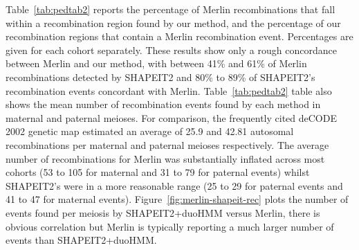 Table~\ref{tab:pedtab2} reports the percentage of Merlin recombinations that fall within a recombination region found by our method, and the percentage of our recombination regions that contain a Merlin recombination event. Percentages are given for each cohort separately. These results show only a rough concordance between Merlin and our method, with between 41\% and 61\% of Merlin recombinations detected by SHAPEIT2 and 80\% to 89\% of SHAPEIT2's recombination events concordant with Merlin.  
\newpage
Table~\ref{tab:pedtab2} table  also shows the mean number of recombination events found by each method in maternal and paternal meioses.  For comparison, the frequently cited deCODE 2002 genetic map estimated an average of 25.9 and 42.81 autosomal recombinations per maternal and paternal meioses respectively. The average number of recombinations for Merlin was substantially inflated across most cohorts (53 to 105 for maternal and 31 to 79 for paternal events) whilst SHAPEIT2's were in a more reasonable range (25 to 29 for paternal events and 41 to 47 for maternal events). Figure~\ref{fig:merlin-shapeit-rec} plots the number of events found per meiosis by SHAPEIT2+duoHMM versus Merlin, there is obvious correlation but Merlin is typically reporting a much larger number of events than SHAPEIT2+duoHMM. 



